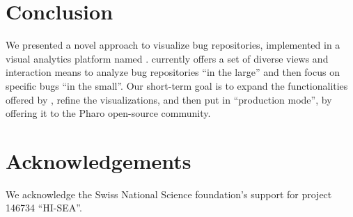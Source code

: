 \section{Conclusion}

We presented a novel approach to visualize bug repositories, implemented in a visual analytics platform named \ib. \ib currently offers a set of diverse views and interaction means to analyze bug repositories ``in the large'' and then focus on specific bugs ``in the small''. Our short-term goal is to expand the functionalities offered by \ib, refine the visualizations, and then put \ib in ``production mode'', by offering it to the Pharo open-source community.


\section*{Acknowledgements}

We acknowledge the Swiss National Science foundation's support for project 146734 ``HI-SEA''.







